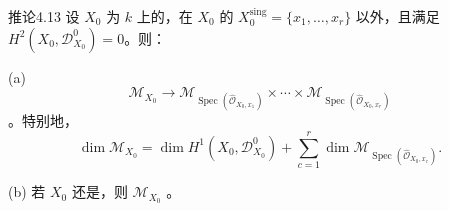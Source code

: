 \begin{SGAresult}{推论}{4.13}
设 $X_0$ 为 $k$ 上的，在 $X_0$ 的 $X_0^{\mathrm{sing}}=\{x_1,\ldots,x_r\}$ 以外，且满足 $H^2(X_0,\mathcal D^0_{X_0})=0$。则：

(a) 
\[
\mathcal M_{X_0}\longrightarrow
\mathcal M_{\operatorname{Spec}(\widehat{\mathcal O}_{X_0,x_1})}\times\cdots\times
\mathcal M_{\operatorname{Spec}(\widehat{\mathcal O}_{X_0,x_r})}
\]
。特别地，
\[
\dim\mathcal M_{X_0}=\dim H^1(X_0,\mathcal D^0_{X_0})
+\sum_{c=1}^r\dim\mathcal M_{\operatorname{Spec}(\widehat{\mathcal O}_{X_0,x_c})}.
\]

(b) 若 $X_0$ 还是，则 $\mathcal M_{X_0}$ 。
\end{SGAresult}
